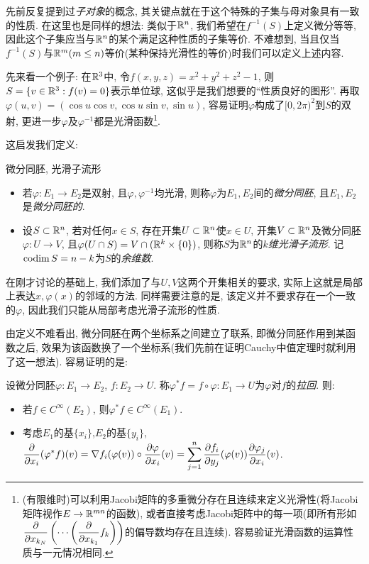 先前反复提到过\textit{子对象}的概念, 其关键点就在于这个特殊的子集与母对象具有一致的性质. 在这里也是同样的想法: 类似于$\mathbb{R} ^n$, 我们希望在$f^{-1}(S)$上定义微分等等, 因此这个子集应当与$\mathbb{R} ^n$的某个满足这种性质的子集等价. 不难想到, 当且仅当$f^{-1}(S)$与$\mathbb{R} ^m(m \leq n)$等价(某种保持光滑性的等价)时我们可以定义上述内容. 

先来看一个例子: 在$\mathbb{R} ^3$中, 令$f(x,y,z) = x^2+y^2+z^2-1$, 则$S = \{ v \in \mathbb{R} ^3 : f(v)=0 \}$表示单位球, 这似乎是我们想要的“性质良好的图形”. 再取$\varphi (u,v) = (\cos u \cos v, \cos u \sin v , \sin u)$, 容易证明$\varphi$构成了$[0,2\pi)^2$到$S$的双射, 更进一步$\varphi$及$\varphi ^{-1}$都是光滑函数\footnote{(有限维时)可以利用Jacobi矩阵的多重微分存在且连续来定义光滑性(将Jacobi矩阵视作$E \to \mathbb{R} ^{mn}$的函数), 或者直接考虑Jacobi矩阵中的每一项(即所有形如$\displaystyle \frac{\partial}{\partial x_{k_N}} \left( \cdots \left( \frac{\partial }{\partial x_{k_1}}f_k \right) \right)$的偏导数均存在且连续). 容易验证光滑函数的运算性质与一元情况相同. }. 

这启发我们定义: 

\begin{definition}{微分同胚, 光滑子流形}
	\vspace{-1em}
	\begin{itemize}
		\item 若$\varphi :E_1 \to E_2$是双射, 且$\varphi ,\varphi ^{-1}$均光滑, 则称$\varphi $为$E_1,E_2$间的\textit{微分同胚}, 且$E_1,E_2$是\textit{微分同胚的}. 
		\item 设$S \subset \mathbb{R} ^n$, 若对任何$x \in S$, 存在开集$U \subset \mathbb{R} ^n$使$x \in U$, 开集$V \subset \mathbb{R} ^n$及微分同胚$\varphi:U \to V$, 且$\varphi (U \cap S) = V \cap (\mathbb{R} ^k \times \{ 0 \})$, 则称$S$为$\mathbb{R} ^n$的\textit{$k$维光滑子流形}. 记$\operatorname{codim} S = n-k$为$S$的\textit{余维数}. 
	\end{itemize}
\end{definition}
\begin{remark}
	在刚才讨论的基础上, 我们添加了与$U,V$这两个开集相关的要求, 实际上这就是局部上表达$x,\varphi (x)$的邻域的方法. 同样需要注意的是, 该定义并不要求存在一个一致的$\varphi$, 因此我们只能从局部考虑光滑子流形的性质. 
\end{remark}

由定义不难看出, 微分同胚在两个坐标系之间建立了联系, 即微分同胚作用到某函数之后, 效果为该函数换了一个坐标系(我们先前在证明Cauchy中值定理时就利用了这一想法). 容易证明的是: 

\begin{proposition}{}
	设微分同胚$\varphi :E_1 \to E_2$, $f:E_2 \to U$. 称$\varphi ^* f = f \circ \varphi : E_1 \to U$为$\varphi$对$f$的\textit{拉回}. 则: 
	\begin{itemize}
		\item 若$f \in C^{\infty}(E_2)$, 则$\varphi ^* f \in C^{\infty}(E_1)$. 
		\item 考虑$E_1$的基$\{ x_i \}$,$E_2$的基$\{ y_i \}$, $\displaystyle \frac{\partial}{\partial x_i} (\varphi ^* f) (v) = \nabla f_i(\varphi (v)) \circ \frac{\partial \varphi}{\partial x_i}(v) = \sum_{j=1}^{n} \frac{\partial f_i}{\partial y_j}(\varphi (v)) \frac{\partial \varphi _j}{\partial x_i}(v)$. 
	\end{itemize}
\end{proposition}

